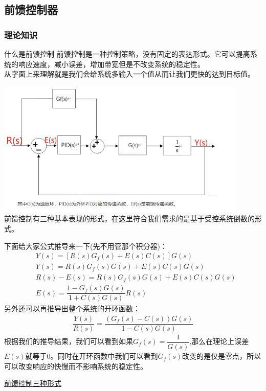 \documentclass[UTF8,a4paper,12pt]{ctexart}
\begin{document}
    \subsection{前馈控制器}
     \subsubsection{理论知识}
      \begin{titlebox}{什么是前馈控制}
        前馈控制是一种控制策略，没有固定的表达形式。它可以提高系统的响应速度，减小误差，增加带宽但是不改变系统的稳定性。\\
        从字面上来理解就是我们会给系统多输入一个值从而让我们更快的达到目标值。
        \par \includegraphics[width=12cm]{picture/FFC.png}
        \\前馈控制有三种基本表现的形式，在这里符合我们需求的是基于受控系统倒数的形式。
        
        下面给大家公式推导来一下(先不用管那个积分器)：
        \begin{align*}
         &Y(s)=[R(s)G_f(s)+E(s)C(s)]G(s)\\
         &Y(s)=R(s)G_f(s)G(s)+E(s)C(s)G(s)\\
         &R(s)-E(s)=R(s)G_f(s)G(s)+E(s)C(s)G(s)\\
         &E(s)=\dfrac{1-G_f(s)G(s)}{1+C(s)G(s)}R(s)
        \end{align*}
        另外还可以再推导出整个系统的开环函数：
        \begin{align*}
          \dfrac{Y(s)}{R(s)}=\dfrac{(G_f(s)-C(s))G(s)}{1-C(s)G(s)}
        \end{align*}
        根据我们的推导结果，我们可以看到如果$G_f(s)=\dfrac{1}{G(s)}$,那么在理论上误差$E(s)$就等于0。同时在开环函数中我们可以看到$G_f(s)$改变的是仅是零点，所以可以改变响应的快慢而不影响系统的稳定性。
        
        \href{https://www.bilibili.com/video/BV1Lj421d7Mr/?spm_id_from=333.1387.favlist.content.click&fvd_source=b02f21f21dd17ebeef8dac9338c9d06c}{前馈控制三种形式}

      \end{titlebox}
\end{document}
